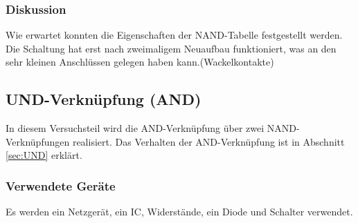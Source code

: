 \documentclass[12pt,a4paper]{article}
\begin{document}
\subsubsection*{Diskussion}
Wie erwartet konnten die Eigenschaften der NAND-Tabelle festgestellt werden. Die Schaltung hat erst nach zweimaligem Neuaufbau funktioniert, was an den sehr kleinen Anschlüssen gelegen haben kann.(Wackelkontakte)
\subsection{UND-Verknüpfung (AND)}

In diesem Versuchsteil wird die AND-Verknüpfung über zwei NAND-Verknüpfungen realisiert. Das Verhalten der AND-Verknüpfung ist in Abschnitt \ref{sec:UND} erklärt.

\subsubsection*{Verwendete Geräte}

Es werden ein Netzgerät, ein IC, Widerstände, ein Diode und Schalter verwendet.
\end{document}
